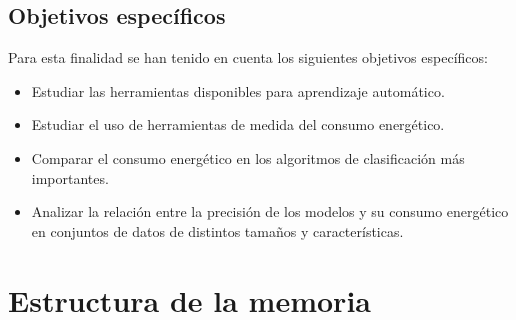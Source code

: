 \subsection{Objetivos específicos}
\label{sec:objetivos-especificos}

Para esta finalidad se han tenido en cuenta los siguientes objetivos específicos:

    \begin{itemize}
        \item Estudiar las herramientas disponibles para aprendizaje automático.
        \item Estudiar el uso de herramientas de medida del consumo energético.
        \item Comparar el consumo energético en los algoritmos de clasificación más importantes.
        \item Analizar la relación entre la precisión de los modelos y su consumo energético en conjuntos de datos de distintos tamaños y características.
    \end{itemize}



\section{Estructura de la memoria}
\label{sec:estructura}


